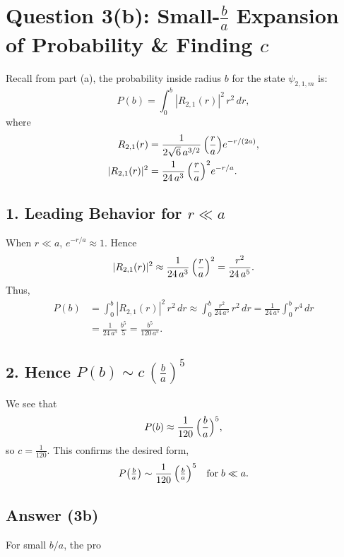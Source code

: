\documentclass[12pt]{article}
\begin{document}
\section*{Question 3(b): Small-$\frac{b}{a}$ Expansion of Probability \& Finding $c$}

Recall from part (a), the probability inside radius $b$ for the state $\psi_{2,1,m}$ is:
\begin{equation}
P(b) = \int_0^b |R_{2,1}(r)|^2 \, r^2 \,dr,
\end{equation}
where
\begin{align*}
R_{2,1}(r) &= \frac{1}{2\sqrt{6}\,a^{3/2}}\,\Bigl(\frac{r}{a}\Bigr) e^{-r/(2a)},\\
|R_{2,1}(r)|^2 &= \frac{1}{24\,a^3}\,\Bigl(\frac{r}{a}\Bigr)^2 e^{-r/a}.
\end{align*}

\subsection*{1. Leading Behavior for $r \ll a$}
When $r\ll a$, $e^{-r/a}\approx 1$. Hence
\begin{equation}
|R_{2,1}(r)|^2 \approx \frac{1}{24\,a^3}\,\Bigl(\frac{r}{a}\Bigr)^2
= \frac{r^2}{24\,a^5}.
\end{equation}
Thus,
\begin{align*}
P(b) &= \int_0^b |R_{2,1}(r)|^2 \, r^2\,dr \approx \int_0^b \frac{r^2}{24\,a^5}\,r^2\,dr
= \frac{1}{24\,a^5} \int_0^b r^4\,dr \\[6pt]
&= \frac{1}{24\,a^5}\,\frac{b^5}{5} = \frac{b^5}{120\,a^5}.
\end{align*}

\subsection*{2. Hence $P(b) \sim c\,(\tfrac{b}{a})^5$}
We see that
\begin{equation}
P(b) \approx \frac{1}{120}\,\Bigl(\frac{b}{a}\Bigr)^5,
\end{equation}
so $c=\tfrac{1}{120}$. This confirms the desired form,
\begin{equation}
P\bigl(\tfrac{b}{a}\bigr) \sim \frac{1}{120}\,\Bigl(\tfrac{b}{a}\Bigr)^5\quad\text{for}\; b\ll a.
\end{equation}

\subsection*{Answer (3b)}
For small $b/a$, the pro
\end{document}

